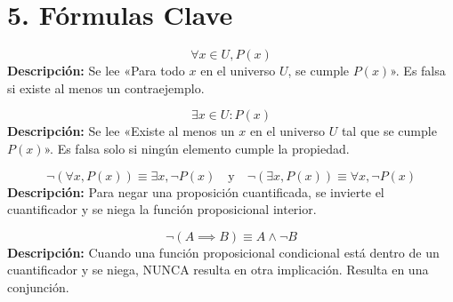 \documentclass[11pt]{article}
\newenvironment{formulas}{\section*{5. Fórmulas Clave}}{}
\newcommand{\formula}[3]{\begin{tcolorbox}[colback=violet!5,colframe=violet!75!black,title=#1]\centering\[ #2 \]\tcblower\flushleft\small\textbf{Descripción:} #3\end{tcolorbox}}
\begin{document}
\begin{formulas}

  \formula{Cuantificador Universal ($\forall$)}
    {\forall x \in U, P(x)}
    {Se lee «Para todo $x$ en el universo $U$, se cumple $P(x)$». Es falsa si existe al menos un contraejemplo.}

  \formula{Cuantificador Existencial ($\exists$)}
    {\exists x \in U : P(x)}
    {Se lee «Existe al menos un $x$ en el universo $U$ tal que se cumple $P(x)$». Es falsa solo si ningún elemento cumple la propiedad.}

  \formula{Leyes de De Morgan Generalizadas}
    {\neg(\forall x, P(x)) \equiv \exists x, \neg P(x) \quad \text{y} \quad \neg(\exists x, P(x)) \equiv \forall x, \neg P(x)}
    {Para negar una proposición cuantificada, se invierte el cuantificador y se niega la función proposicional interior.}

  \formula{Negación de la Implicación (Vital para ejercicios)}
    {\neg(A \implies B) \equiv A \wedge \neg B}
    {Cuando una función proposicional condicional está dentro de un cuantificador y se niega, NUNCA resulta en otra implicación. Resulta en una conjunción.}

\end{formulas}
\end{document}
